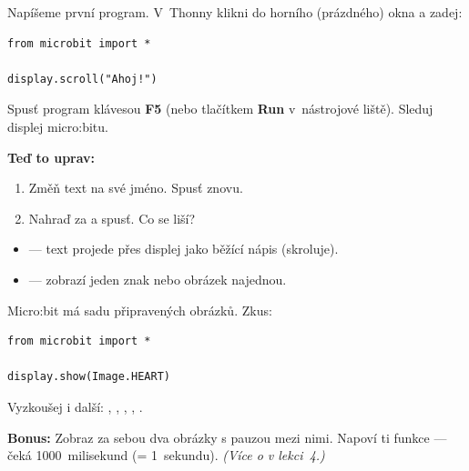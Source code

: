 \begin{ukol}

Napíšeme první program. V~Thonny klikni do horního (prázdného) okna a zadej:

\begin{lstlisting}
from microbit import *

display.scroll("Ahoj!")
\end{lstlisting}


Spusť program klávesou \textbf{F5} (nebo tlačítkem \textbf{Run} v~nástrojové liště).
Sleduj displej micro:bitu.

\bigskip\noindent
\textbf{Teď to uprav:}
\begin{enumerate}
  \item Změň text  na své jméno. Spusť znovu.
  \item Nahraď  za  a spusť.
        Co se liší?
\end{enumerate}

\odpoved[2.5cm]

\begin{tcolorbox}[colback=code-bg, colframe=gray!40, fonttitle=\small\bfseries,
                  title=Co dělají tyto příkazy?]
  \small
  \begin{itemize}[leftmargin=*]
    \item {} — text projede přes displej jako
          běžící nápis (skroluje).
    \item {} — zobrazí jeden znak nebo obrázek najednou.
  \end{itemize}
\end{tcolorbox}

\end{ukol}

\begin{ukol}[Obrázky]

Micro:bit má sadu připravených obrázků. Zkus:

\begin{lstlisting}
from microbit import *

display.show(Image.HEART)
\end{lstlisting}

Vyzkoušej i další: , ,
, , .

\bigskip\noindent
\textbf{Bonus:} Zobraz za sebou dva obrázky s pauzou mezi nimi.
Napoví ti funkce  — čeká 1000~milisekund (= 1~sekundu).
\textit{(Více o  v lekci~4.)}

\odpoved[2cm]

\end{ukol}

